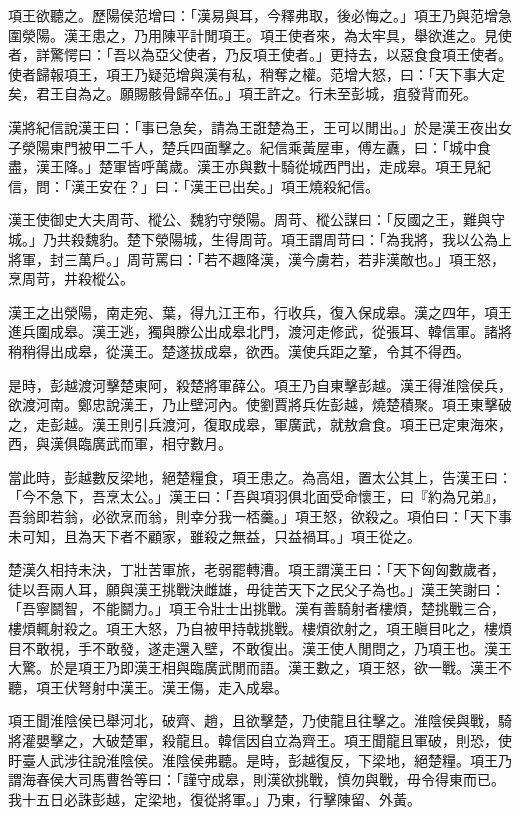 \begin{pinyinscope}
項王欲聽之。歷陽侯范增曰：「漢易與耳，今釋弗取，後必悔之。」項王乃與范增急圍滎陽。漢王患之，乃用陳平計閒項王。項王使者來，為太牢具，舉欲進之。見使者，詳驚愕曰：「吾以為亞父使者，乃反項王使者。」更持去，以惡食食項王使者。使者歸報項王，項王乃疑范增與漢有私，稍奪之權。范增大怒，曰：「天下事大定矣，君王自為之。願賜骸骨歸卒伍。」項王許之。行未至彭城，疽發背而死。

漢將紀信說漢王曰：「事已急矣，請為王誑楚為王，王可以閒出。」於是漢王夜出女子滎陽東門被甲二千人，楚兵四面擊之。紀信乘黃屋車，傅左纛，曰：「城中食盡，漢王降。」楚軍皆呼萬歲。漢王亦與數十騎從城西門出，走成皋。項王見紀信，問：「漢王安在？」曰：「漢王已出矣。」項王燒殺紀信。

漢王使御史大夫周苛、樅公、魏豹守滎陽。周苛、樅公謀曰：「反國之王，難與守城。」乃共殺魏豹。楚下滎陽城，生得周苛。項王謂周苛曰：「為我將，我以公為上將軍，封三萬戶。」周苛罵曰：「若不趣降漢，漢今虜若，若非漢敵也。」項王怒，烹周苛，井殺樅公。

漢王之出滎陽，南走宛、葉，得九江王布，行收兵，復入保成皋。漢之四年，項王進兵圍成皋。漢王逃，獨與滕公出成皋北門，渡河走修武，從張耳、韓信軍。諸將稍稍得出成皋，從漢王。楚遂拔成皋，欲西。漢使兵距之鞏，令其不得西。

是時，彭越渡河擊楚東阿，殺楚將軍薛公。項王乃自東擊彭越。漢王得淮陰侯兵，欲渡河南。鄭忠說漢王，乃止壁河內。使劉賈將兵佐彭越，燒楚積聚。項王東擊破之，走彭越。漢王則引兵渡河，復取成皋，軍廣武，就敖倉食。項王已定東海來，西，與漢俱臨廣武而軍，相守數月。

當此時，彭越數反梁地，絕楚糧食，項王患之。為高俎，置太公其上，告漢王曰：「今不急下，吾烹太公。」漢王曰：「吾與項羽俱北面受命懷王，曰『約為兄弟』，吾翁即若翁，必欲烹而翁，則幸分我一桮羹。」項王怒，欲殺之。項伯曰：「天下事未可知，且為天下者不顧家，雖殺之無益，只益禍耳。」項王從之。

楚漢久相持未決，丁壯苦軍旅，老弱罷轉漕。項王謂漢王曰：「天下匈匈數歲者，徒以吾兩人耳，願與漢王挑戰決雌雄，毋徒苦天下之民父子為也。」漢王笑謝曰：「吾寧鬬智，不能鬬力。」項王令壯士出挑戰。漢有善騎射者樓煩，楚挑戰三合，樓煩輒射殺之。項王大怒，乃自被甲持戟挑戰。樓煩欲射之，項王瞋目叱之，樓煩目不敢視，手不敢發，遂走還入壁，不敢復出。漢王使人閒問之，乃項王也。漢王大驚。於是項王乃即漢王相與臨廣武閒而語。漢王數之，項王怒，欲一戰。漢王不聽，項王伏弩射中漢王。漢王傷，走入成皋。

項王聞淮陰侯已舉河北，破齊、趙，且欲擊楚，乃使龍且往擊之。淮陰侯與戰，騎將灌嬰擊之，大破楚軍，殺龍且。韓信因自立為齊王。項王聞龍且軍破，則恐，使盱臺人武涉往說淮陰侯。淮陰侯弗聽。是時，彭越復反，下梁地，絕楚糧。項王乃謂海春侯大司馬曹咎等曰：「謹守成皋，則漢欲挑戰，慎勿與戰，毋令得東而已。我十五日必誅彭越，定梁地，復從將軍。」乃東，行擊陳留、外黃。


\end{pinyinscope}
